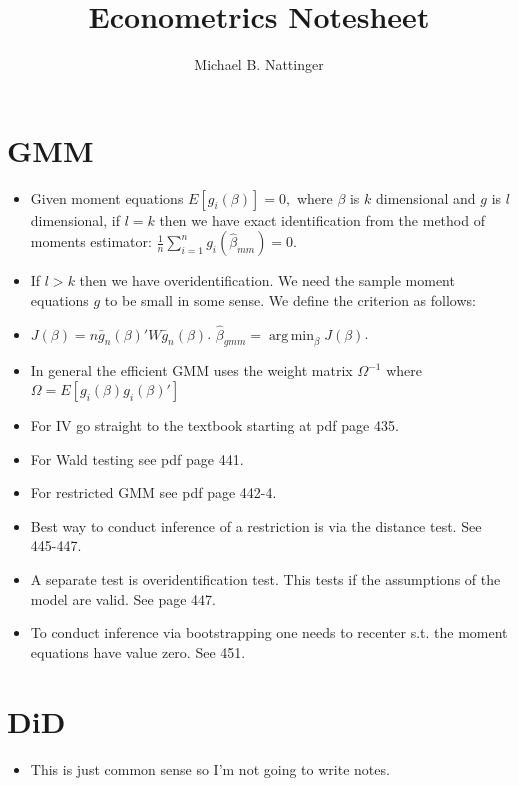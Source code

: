 \documentclass[11pt]{article} %
\title{Econometrics Notesheet}
\author{Michael B. Nattinger}
\DeclareMathOperator*{\argmin}{arg\,min}
\begin{document}
\maketitle

\section{GMM}
\begin{itemize}
\item Given moment equations $E[g_i(\beta)] = 0,$ where $\beta$ is $k$ dimensional and $g$ is $l$ dimensional, if $l=k$ then we have exact identification from the method of moments estimator: $\frac{1}{n} \sum_{i=1}^n g_i(\hat{\beta}_{mm}) = 0$.
\item If $l>k$ then we have overidentification. We need the sample moment equations $g$ to be small in some sense. We define the criterion as follows:
\item $J(\beta) = n \bar{g}_n(\beta)'W\bar{g}_n(\beta)$. $\hat{\beta}_{gmm} = \argmin_\beta J(\beta)$.   
\item In general the efficient GMM uses the weight matrix $\Omega^{-1}$ where $\Omega = E[g_i(\beta)g_i(\beta)']$ 
\item For IV go straight to the textbook starting at pdf page 435.
\item For Wald testing see pdf page 441.
\item For restricted GMM see pdf page 442-4.
\item Best way to conduct inference of a restriction is via the distance test. See 445-447.
\item A separate test is overidentification test. This tests if the assumptions of the model are valid. See page 447.
\item To conduct inference via bootstrapping one needs to recenter s.t. the moment equations have value zero. See 451.
\end{itemize}

\section{DiD}
\begin{itemize}
\item This is just common sense so I'm not going to write notes.
\end{itemize}
\end{document}
